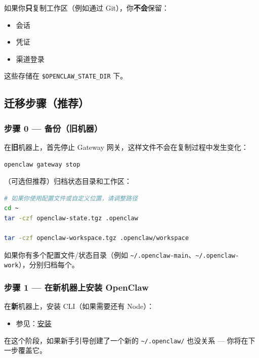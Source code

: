 如果你\textbf{只}复制工作区（例如通过 Git），你\textbf{不会}保留：

\begin{itemize}
  \item 会话
  \item 凭证
  \item 渠道登录
\end{itemize}


这些存储在 \texttt{\$OPENCLAW\_STATE\_DIR} 下。

\subsection{迁移步骤（推荐）}


\subsubsection{步骤 0 — 备份（旧机器）}


在\textbf{旧}机器上，首先停止 Gateway 网关，这样文件不会在复制过程中发生变化：

\begin{lstlisting}[language=bash]
openclaw gateway stop
\end{lstlisting}


（可选但推荐）归档状态目录和工作区：

\begin{lstlisting}[language=bash]
# 如果你使用配置文件或自定义位置，请调整路径
cd ~
tar -czf openclaw-state.tgz .openclaw

tar -czf openclaw-workspace.tgz .openclaw/workspace
\end{lstlisting}


如果你有多个配置文件/状态目录（例如 \texttt{\textasciitilde{}/.openclaw-main}、\texttt{\textasciitilde{}/.openclaw-work}），分别归档每个。

\subsubsection{步骤 1 — 在新机器上安装 OpenClaw}


在\textbf{新}机器上，安装 CLI（如果需要还有 Node）：

\begin{itemize}
  \item 参见：\href{/install}{安装}
\end{itemize}


在这个阶段，如果新手引导创建了一个新的 \texttt{\textasciitilde{}/.openclaw/} 也没关系 — 你将在下一步覆盖它。

